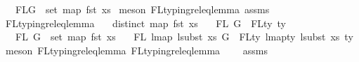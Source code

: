 \begin{isabellebody}
\ \ {\isasymand}\ FLG\ {\isacharequal}{\kern0pt}\ set\ {\isacharparenleft}{\kern0pt}map\ fst\ xs{}{\isacharparenright}{\kern0pt}{\isacharparenright}{\kern0pt}{\isachardoublequoteclose}\isanewline
%
\isadelimproof
%
\endisadelimproof
%
\isatagproof
{}\isamarkupfalse%
\ {\isacharparenleft}{\kern0pt}meson\ FL{\isacharunderscore}{\kern0pt}typing{\isacharunderscore}{\kern0pt}rel{\isacharunderscore}{\kern0pt}eq{\isacharunderscore}{\kern0pt}lemma{}\ assms{\isacharparenleft}{\kern0pt}{}{\isacharcomma}{\kern0pt}{}{\isacharparenright}{\kern0pt}{\isacharparenright}{\kern0pt}%
\endisatagproof
{\isafoldproof}%
%
\isadelimproof
\isanewline
%
\endisadelimproof
\isanewline
\isanewline
{}\isamarkupfalse%
\ FL{\isacharunderscore}{\kern0pt}typing{\isacharunderscore}{\kern0pt}rel{\isacharunderscore}{\kern0pt}eq{\isacharunderscore}{\kern0pt}lemma{}{\isacharcolon}{\kern0pt}\isanewline
\ \ \ {\isachardoublequoteopen}distinct\ {\isacharparenleft}{\kern0pt}map\ fst\ xs{\isacharparenright}{\kern0pt}{\isachardoublequoteclose}\isanewline
\ \ \ {\isachardoublequoteopen}FL\ G\ {\isacharequal}{\kern0pt}\ FLty\ ty{\isachardoublequoteclose}\isanewline
\ \ \ {\isachardoublequoteopen}FL\ G\ {\isasymsubseteq}\ set\ {\isacharparenleft}{\kern0pt}map\ fst\ xs{\isacharparenright}{\kern0pt}{\isachardoublequoteclose}\isanewline
\ \ \ {\isachardoublequoteopen}FL\ {\isacharparenleft}{\kern0pt}lmap\ {\isacharparenleft}{\kern0pt}lsubst\ xs{\isacharparenright}{\kern0pt}\ G{\isacharparenright}{\kern0pt}\ {\isacharequal}{\kern0pt}\ FLty\ {\isacharparenleft}{\kern0pt}lmap{\isacharunderscore}{\kern0pt}ty\ {\isacharparenleft}{\kern0pt}lsubst\ xs{\isacharparenright}{\kern0pt}\ ty{\isacharparenright}{\kern0pt}{\isachardoublequoteclose}\isanewline
%
\isadelimproof
%
\endisadelimproof
%
\isatagproof
{}\isamarkupfalse%
\ {\isacharparenleft}{\kern0pt}meson\ FL{\isacharunderscore}{\kern0pt}typing{\isacharunderscore}{\kern0pt}rel{\isacharunderscore}{\kern0pt}eq{\isacharunderscore}{\kern0pt}lemma{}\ FL{\isacharunderscore}{\kern0pt}typing{\isacharunderscore}{\kern0pt}rel{\isacharunderscore}{\kern0pt}eq{\isacharunderscore}{\kern0pt}lemma{}\isanewline
\ \ \ \ assms{\isacharparenleft}{\kern0pt}{}{\isacharcomma}{\kern0pt}{}{\isacharcomma}{\kern0pt}{}{\isacharparenright}{\kern0pt}{\isacharparenright}{\kern0pt}%
\endisatagproof
{\isafoldproof}%
%
\isadelimproof
\isanewline

\end{isabellebody}
